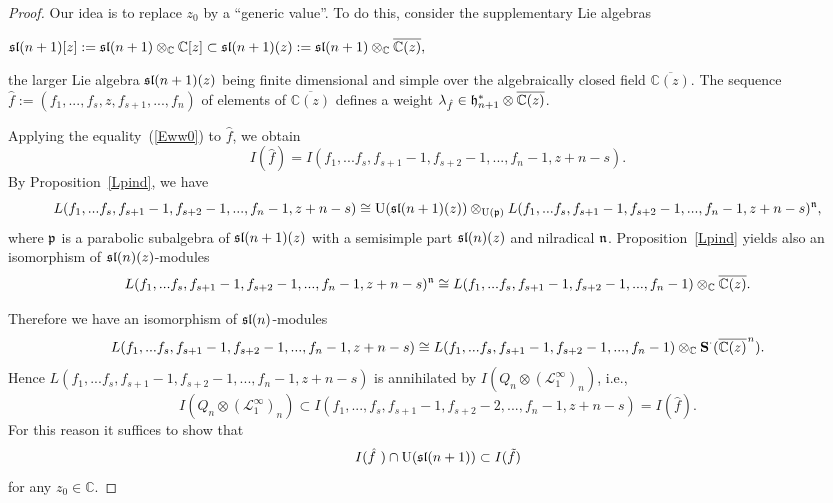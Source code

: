 \documentclass[10pt]{amsart}\oddsidemargin -1mm \evensidemargin -1mm \topmargin -15mm\headheight5mm \headsep 3.5mm \textheight 245mm\textwidth 170mm %
\theoremstyle{definition}\newtheorem{theorem}{Theorem}[section]\newtheorem{lemma}[theorem]{Lemma}\newtheorem{remark}[theorem]{Remark}\newtheorem{proposition}[theorem]{Proposition}\newtheorem{corollary}[theorem]{Corollary}\newtheorem{definition}[theorem]{Definition}\newtheorem{Ex}[theorem]{Example}
\begin{document}
\begin{proof}Our idea is to replace $z_0$ by a ``generic value''. To do this, consider the supplementary Lie algebras
\begin{center} $\frak{sl}(n+1)[z]:=\frak{sl}(n+1)\otimes_{\mathbb C}\mathbb C[z] \subset\frak{sl}(n+1)(z):=\frak{sl}(n+1)\otimes_{\mathbb C}\overline{\mathbb C(z)},$\end{center}the larger Lie algebra $\frak{sl}(n+1)(z)$ being finite dimensional and simple over the algebraically closed field $\overline{\mathbb C(z)}$. The sequence $\hat f:=(f_1,..., f_s, z, f_{s+1},..., f_n)$ of elements of $\overline{\mathbb C(z)}$ defines a weight $\lambda_{\hat f}\in\frak h_{n+1}^*\otimes\overline{\mathbb C(z)}$.

Applying the equality~(\ref{Eww0}) to $\hat f$, we obtain
$$I(\hat f)=I(f_1,...f_s, f_{s+1}-1, f_{s+2}-1,..., f_n-1, z+n-s).$$By Proposition~\ref{Lpind}, we have
$$L(f_1,...f_s, f_{s+1}-1, f_{s+2}-1,..., f_n-1, z+n-s)\cong \operatorname{\mathrm{U}}(\frak{sl}(n+1)(z))\otimes_{\operatorname{\mathrm{U}}(\frak p)}L(f_1,...f_s, f_{s+1}-1, f_{s+2}-1,..., f_n-1, z+n-s)^{\frak n},$$where  $\frak p$ is a parabolic subalgebra of $\frak{sl}(n+1)(z)$ with a semisimple part $\frak{sl}(n)(z)$ and nilradical $\frak n$. Proposition~\ref{Lpind} yields also an isomorphism of $\frak{sl}(n)(z)$-modules
$$L(f_1,...f_s, f_{s+1}-1, f_{s+2}-1,..., f_n-1, z+n-s)^{\frak n}\cong L(f_1,...f_s, f_{s+1}-1, f_{s+2}-1,..., f_n-1)\otimes_{\mathbb C}\overline{\mathbb C(z)}.$$


Therefore we have an isomorphism of $\frak{sl}(n)$-modules $$L(f_1,...f_s, f_{s+1}-1, f_{s+2}-1,..., f_n-1, z+n-s)\cong L(f_1,...f_s, f_{s+1}-1, f_{s+2}-1,..., f_n-1)\otimes_{\mathbb C}\operatorname{\mathbf{S}}^\cdot(\overline{\mathbb C(z)}^{\!\!~n}).$$ Hence $L(f_1,...f_s, f_{s+1}-1, f_{s+2}-1,..., f_n-1, z+n-s)$ is annihilated by $I(Q_n\otimes (\mathcal L_1^\infty)_n)$, i.e., $$I(Q_n\otimes (\mathcal L_1^\infty)_n)\subset I(f_1,...,f_s, f_{s+1}-1, f_{s+2}-2,..., f_n-1, z+n-s)=I(\hat f).$$
For this reason it suffices to show that $$I(\hat f~)\cap\operatorname{\mathrm{U}}(\frak{sl}(n+1))\subset I(\tilde f)$$for any $z_0\in\mathbb C$.%


\end{proof}
\end{document}
